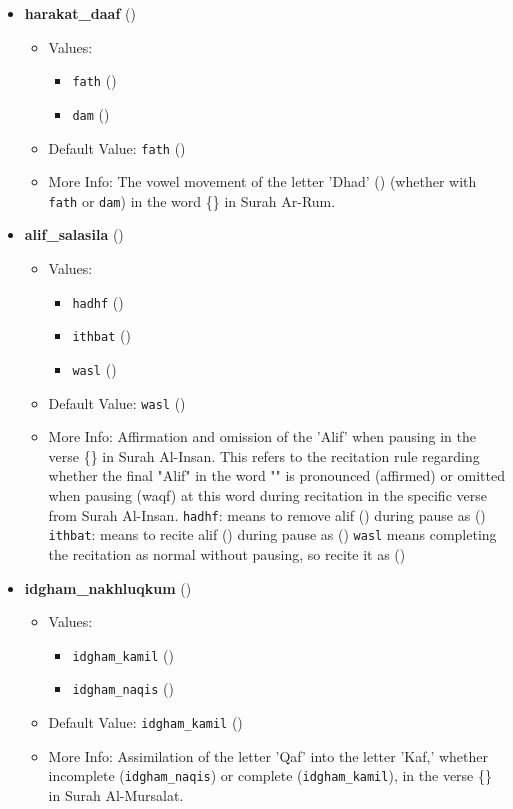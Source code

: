 \begin{itemize}
\item \textbf{harakat\_daaf} ()
  \begin{itemize}
  \item Values: 
    \begin{itemize}
    \item  \texttt{fath} ()
    \item  \texttt{dam} ()
    \end{itemize}
  \item Default Value: \texttt{fath} ()
  \item More Info: The vowel movement of the letter 'Dhad' () (whether with \texttt{fath} or \texttt{dam}) in the word \{\} in Surah Ar-Rum.
  \end{itemize}

\item \textbf{alif\_salasila} ()
  \begin{itemize}
  \item Values: 
    \begin{itemize}
    \item  \texttt{hadhf} ()
    \item  \texttt{ithbat} ()
    \item  \texttt{wasl} ()
    \end{itemize}
  \item Default Value: \texttt{wasl} ()
  \item More Info: Affirmation and omission of the 'Alif' when pausing in the verse \{\} in Surah Al-Insan. This refers to the recitation rule regarding whether the final "Alif" in the word "" is pronounced (affirmed) or omitted when pausing (waqf) at this word during recitation in the specific verse from Surah Al-Insan. \texttt{hadhf}: means to remove alif () during pause as () \texttt{ithbat}: means to recite alif () during pause as () \texttt{wasl} means completing the recitation as normal without pausing, so recite it as ()
  \end{itemize}

\item \textbf{idgham\_nakhluqkum} ()
  \begin{itemize}
  \item Values: 
    \begin{itemize}
    \item  \texttt{idgham\_kamil} ()
    \item  \texttt{idgham\_naqis} ()
    \end{itemize}
  \item Default Value: \texttt{idgham\_kamil} ()
  \item More Info: Assimilation of the letter 'Qaf' into the letter 'Kaf,' whether incomplete (\texttt{idgham\_naqis}) or complete (\texttt{idgham\_kamil}), in the verse \{\} in Surah Al-Mursalat.
  \end{itemize}


\end{itemize}
